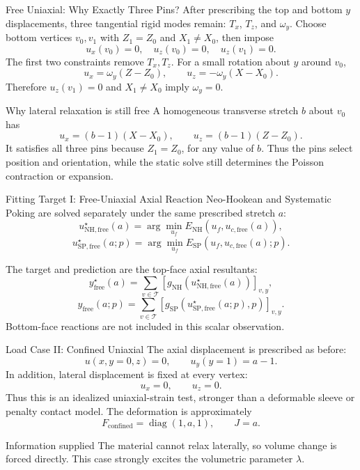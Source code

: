 \documentclass[aspectratio=169,10pt]{beamer}
\begin{document}
\begin{frame}{Free Uniaxial: Why Exactly Three Pins?}
  \small
  After prescribing the top and bottom $y$ displacements, three tangential
  rigid modes remain: $T_x$, $T_z$, and $\omega_y$. Choose bottom vertices
  $v_0,v_1$ with $Z_1=Z_0$ and $X_1\neq X_0$, then impose
  \[
    \boxed{u_x(v_0)=0,\quad u_z(v_0)=0,\quad u_z(v_1)=0.}
  \]
  The first two constraints remove $T_x,T_z$. For a small rotation about
  $y$ around $v_0$,
  \[
    u_x=\omega_y(Z-Z_0),\qquad
    u_z=-\omega_y(X-X_0).
  \]
  Therefore $u_z(v_1)=0$ and $X_1\neq X_0$ imply $\omega_y=0$.

  \begin{block}{Why lateral relaxation is still free}
    A homogeneous transverse stretch $b$ about $v_0$ has
    \[
      u_x=(b-1)(X-X_0),\qquad
      u_z=(b-1)(Z-Z_0).
    \]
    It satisfies all three pins because $Z_1=Z_0$, for any value of $b$.
    Thus the pins select position and orientation, while the static solve
    still determines the Poisson contraction or expansion.
  \end{block}
\end{frame}

\begin{frame}{Fitting Target I: Free-Uniaxial Axial Reaction}
  \small
  Neo-Hookean and Systematic Poking are solved separately under the same
  prescribed stretch $a$:
  \[
    u_{\mathrm{NH,free}}^\star(a)
    =
    \arg\min_{u_f}E_{\mathrm{NH}}(u_f,u_{c,\mathrm{free}}(a)),
  \]
  \[
    u_{\mathrm{SP,free}}^\star(a;p)
    =
    \arg\min_{u_f}E_{\mathrm{SP}}
      (u_f,u_{c,\mathrm{free}}(a);p).
  \]

  The target and prediction are the top-face axial resultants:
  \[
    \boxed{
      y_{\mathrm{free}}^\star(a)
      =
      \sum_{v\in\mathcal T}
      [g_{\mathrm{NH}}(u_{\mathrm{NH,free}}^\star(a))]_{v,y}
    },
  \]
  \[
    \boxed{
      y_{\mathrm{free}}(a;p)
      =
      \sum_{v\in\mathcal T}
      [g_{\mathrm{SP}}(u_{\mathrm{SP,free}}^\star(a;p),p)]_{v,y}
    }.
  \]
  Bottom-face reactions are not included in this scalar observation.
\end{frame}

\begin{frame}{Load Case II: Confined Uniaxial}
  \small
  The axial displacement is prescribed as before:
  \[
    u(x,y=0,z)=0,
    \qquad
    u_y(y=1)=a-1.
  \]
  In addition, lateral displacement is fixed at every vertex:
  \[
    u_x=0,\qquad u_z=0.
  \]
  Thus this is an idealized uniaxial-strain test, stronger than a deformable
  sleeve or penalty contact model. The deformation is approximately
  \[
    \boxed{
      F_{\mathrm{confined}}
      =
      \operatorname{diag}(1,a,1),
      \qquad
      J=a
    }.
  \]

  \begin{block}{Information supplied}
    The material cannot relax laterally, so volume change is forced directly.
    This case strongly excites the volumetric parameter $\lambda$.
  \end{block}
\end{frame}
\end{document}
